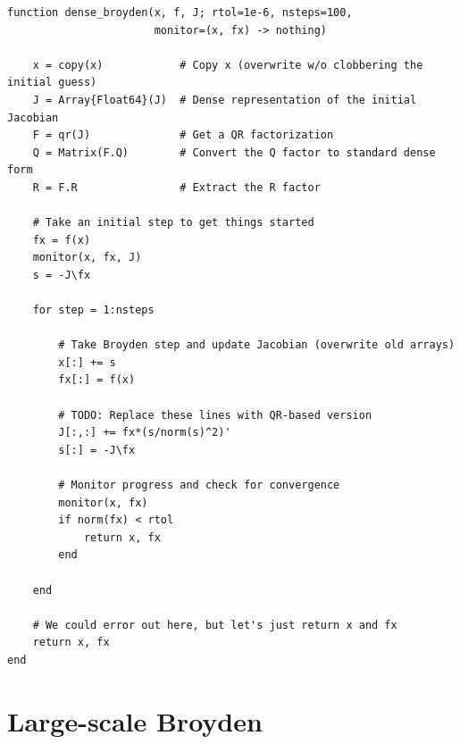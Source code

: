 \documentclass[12pt, leqno]{article} %
\begin{document}
\begin{verbatim}
function dense_broyden(x, f, J; rtol=1e-6, nsteps=100,
                       monitor=(x, fx) -> nothing)

    x = copy(x)            # Copy x (overwrite w/o clobbering the initial guess)
    J = Array{Float64}(J)  # Dense representation of the initial Jacobian
    F = qr(J)              # Get a QR factorization
    Q = Matrix(F.Q)        # Convert the Q factor to standard dense form
    R = F.R                # Extract the R factor
    
    # Take an initial step to get things started
    fx = f(x)
    monitor(x, fx, J)
    s = -J\fx
    
    for step = 1:nsteps
        
        # Take Broyden step and update Jacobian (overwrite old arrays)
        x[:] += s
        fx[:] = f(x)
        
        # TODO: Replace these lines with QR-based version
        J[:,:] += fx*(s/norm(s)^2)'
        s[:] = -J\fx
        
        # Monitor progress and check for convergence
        monitor(x, fx)
        if norm(fx) < rtol
            return x, fx
        end
        
    end
    
    # We could error out here, but let's just return x and fx
    return x, fx
end
\end{verbatim}

\section{Large-scale Broyden}
\end{document}
